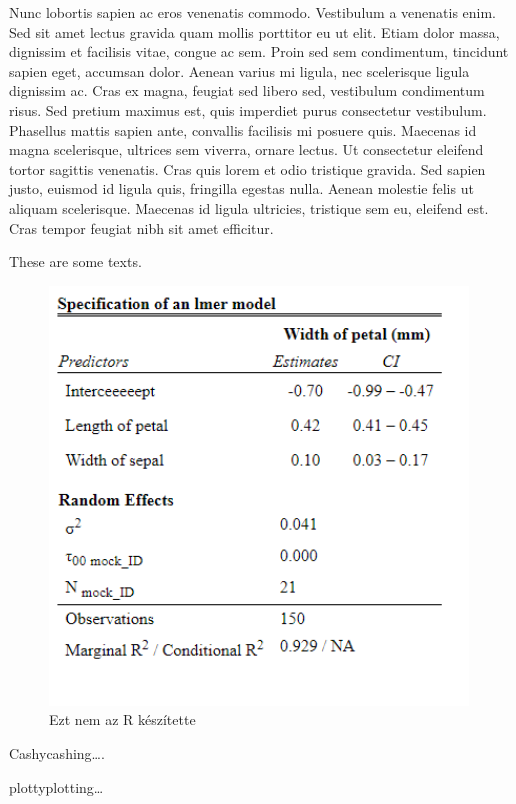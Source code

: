 \documentclass[
]{article}
\begin{document}
Nunc lobortis sapien ac eros venenatis commodo. Vestibulum a venenatis
enim. Sed sit amet lectus gravida quam mollis porttitor eu ut elit.
Etiam dolor massa, dignissim et facilisis vitae, congue ac sem. Proin
sed sem condimentum, tincidunt sapien eget, accumsan dolor. Aenean
varius mi ligula, nec scelerisque ligula dignissim ac. Cras ex magna,
feugiat sed libero sed, vestibulum condimentum risus. Sed pretium
maximus est, quis imperdiet purus consectetur vestibulum. Phasellus
mattis sapien ante, convallis facilisis mi posuere quis. Maecenas id
magna scelerisque, ultrices sem viverra, ornare lectus. Ut consectetur
eleifend tortor sagittis venenatis. Cras quis lorem et odio tristique
gravida. Sed sapien justo, euismod id ligula quis, fringilla egestas
nulla. Aenean molestie felis ut aliquam scelerisque. Maecenas id ligula
ultricies, tristique sem eu, eleifend est. Cras tempor feugiat nibh sit
amet efficitur.

These are some texts.

\begin{figure}[H]
\includegraphics[width = 30em]{figures/webshot.png}
\centering
\caption{Ezt nem az R készítette}
\label{fig:webshot_sjPlot}
\end{figure}

Cashycashing\ldots.

plottyplotting\ldots{}
\end{document}
